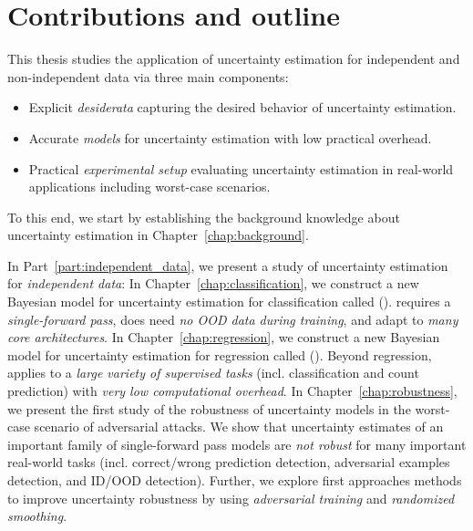 \section{Contributions and outline}

This thesis studies the application of uncertainty estimation for independent and non-independent data via three main components:
\begin{itemize}
    \item Explicit \emph{desiderata} capturing the desired behavior of uncertainty estimation.
    \item Accurate \emph{models} for uncertainty estimation with low practical overhead.
    \item Practical \emph{experimental setup} evaluating uncertainty estimation in real-world applications including worst-case scenarios.
\end{itemize} 

To this end, we start by establishing the background knowledge about uncertainty estimation in Chapter~\ref{chap:background}.

In Part~\ref{part:independent_data}, we present a study of uncertainty estimation for \emph{independent data}: 
In Chapter~\ref{chap:classification}, we construct a new Bayesian model for uncertainty estimation for classification called \PostNet{} (\PostNetacro{}). \PostNetacro{} requires a \emph{single-forward pass}, does need \emph{no OOD data during training}, and adapt to \emph{many core architectures}.
In Chapter~\ref{chap:regression}, we construct a new Bayesian model for uncertainty estimation for regression called \NatPN{} (\NatPNacro{}). Beyond regression, \NatPNacro{} applies to a \emph{large variety of supervised tasks} (incl. classification and count prediction) with \emph{very low computational overhead}.
In Chapter~\ref{chap:robustness}, we present the first study of the robustness of uncertainty models in the worst-case scenario of adversarial attacks. We show that uncertainty estimates of an important family of single-forward pass models are \emph{not robust} for many important real-world tasks (incl. correct/wrong prediction detection, adversarial examples detection, and ID/OOD detection). Further, we explore first approaches methods to improve uncertainty robustness by using \emph{adversarial training} and \emph{randomized smoothing}. 

